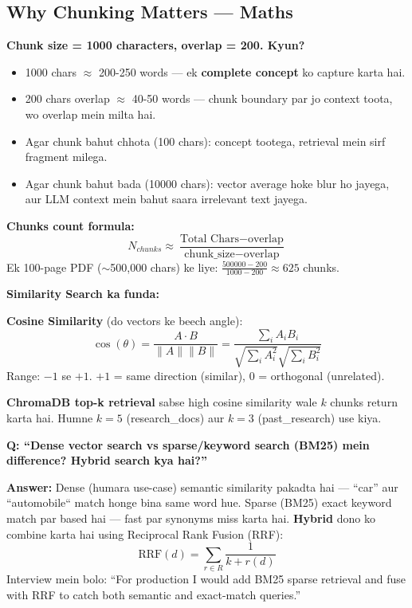 \documentclass[11pt, a4paper]{article}
\begin{document}
\subsection{Why Chunking Matters --- Maths}

\begin{mathbox}
\textbf{Chunk size = 1000 characters, overlap = 200. Kyun?}

\begin{itemize}
\item 1000 chars $\approx$ 200-250 words --- ek \textbf{complete concept} ko capture karta hai.
\item 200 chars overlap $\approx$ 40-50 words --- chunk boundary par jo context toota, wo overlap mein milta hai.
\item Agar chunk bahut chhota (100 chars): concept tootega, retrieval mein sirf fragment milega.
\item Agar chunk bahut bada (10000 chars): vector average hoke blur ho jayega, aur LLM context mein bahut saara irrelevant text jayega.
\end{itemize}

\textbf{Chunks count formula:}
\[
N_{chunks} \approx \frac{\text{Total Chars} - \text{overlap}}{\text{chunk\_size} - \text{overlap}}
\]
Ek 100-page PDF ($\sim$500,000 chars) ke liye: $\frac{500000-200}{1000-200} \approx 625$ chunks.
\end{mathbox}

\begin{conceptbox}
\textbf{Similarity Search ka funda:}

\textbf{Cosine Similarity} (do vectors ke beech angle):
\[
\cos(\theta) = \frac{A \cdot B}{\|A\| \|B\|} = \frac{\sum_i A_i B_i}{\sqrt{\sum_i A_i^2}\sqrt{\sum_i B_i^2}}
\]
Range: $-1$ se $+1$. $+1$ = same direction (similar), $0$ = orthogonal (unrelated).

\textbf{ChromaDB top-k retrieval} sabse high cosine similarity wale $k$ chunks return karta hai. Humne $k=5$ (research\_docs) aur $k=3$ (past\_research) use kiya.
\end{conceptbox}

\begin{interviewbox}
\textbf{Q: ``Dense vector search vs sparse/keyword search (BM25) mein difference? Hybrid search kya hai?''}

\textbf{Answer:} Dense (humara use-case) semantic similarity pakadta hai --- ``car'' aur ``automobile`` match honge bina same word hue. Sparse (BM25) exact keyword match par based hai --- fast par synonyms miss karta hai. \textbf{Hybrid} dono ko combine karta hai using Reciprocal Rank Fusion (RRF):
\[
\text{RRF}(d) = \sum_{r \in R} \frac{1}{k + r(d)}
\]
Interview mein bolo: ``For production I would add BM25 sparse retrieval and fuse with RRF to catch both semantic and exact-match queries.''
\end{interviewbox}
\end{document}
